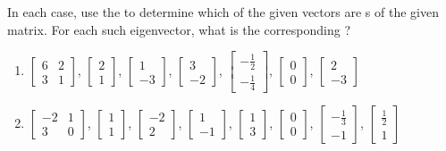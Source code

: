\begin{exercise}
In each case, use the  to determine which of the given vectors are s of the given matrix.
For each such eigenvector, what is the corresponding ?
\begin{enumerate}
\item \(\begin{bmatrix} 6&2\\3&1 \end{bmatrix}\),\quad
\(\begin{bmatrix}2\\1\end{bmatrix}\), \(\begin{bmatrix}1\\-3\end{bmatrix}\), \(\begin{bmatrix}3\\-2\end{bmatrix}\), \(\begin{bmatrix}-\frac12\\-\frac14\end{bmatrix}\), \(\begin{bmatrix}0\\0\end{bmatrix}\), \(\begin{bmatrix}2\\-3\end{bmatrix}\)

\item \(\begin{bmatrix} -2&1\\3&0 \end{bmatrix}\),\quad
\(\begin{bmatrix}1\\1\end{bmatrix}\), \(\begin{bmatrix}-2\\2\end{bmatrix}\), \(\begin{bmatrix}1\\-1\end{bmatrix}\), \(\begin{bmatrix}1\\3\end{bmatrix}\), \(\begin{bmatrix}0\\0\end{bmatrix}\), \(\begin{bmatrix}-\frac13\\-1\end{bmatrix}\), \(\begin{bmatrix}\frac12\\1\end{bmatrix}\)


\end{enumerate}
\end{exercise}
